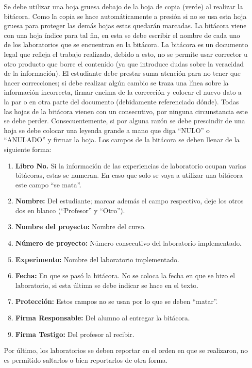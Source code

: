 \documentclass{report}
\begin{document}
Se debe utilizar una hoja gruesa debajo de la hoja de copia (verde) al realizar la
bitácora. Como la copia se hace automáticamente a presión si no se usa esta hoja gruesa para proteger las demás hojas estas quedarán marcadas. La bitácora
viene con una hoja índice para tal fin, en esta se debe escribir el nombre de cada
uno de los laboratorios que se encuentran en la bitácora.
La bitácora es un documento legal que refleja el trabajo realizado, debido a esto,
no se permite usar corrector u otro producto que borre el contenido (ya que
introduce dudas sobre la veracidad de la información). El estudiante debe prestar
suma atención para no tener que hacer correcciones; si debe realizar algún
cambio se traza una línea sobre la información incorrecta, firmar encima de la
corrección y colocar el nuevo dato a la par o en otra parte del documento
(debidamente referenciado dónde).
Todas las hojas de la bitácora vienen con un consecutivo, por ninguna
circunstancia este se debe perder. Consecuentemente, si por alguna razón se
debe prescindir de una hoja se debe colocar una leyenda grande a mano que diga
“NULO” o “ANULADO” y firmar la hoja.
Los campos de la bitácora se deben llenar de la siguiente forma:
\begin{enumerate}
\item \textbf{Libro No.} Si la información de las experiencias de laboratorio ocupan varias
bitácoras, estas se numeran. En caso que solo se vaya a utilizar una
bitácora este campo “se mata”.
\item \textbf{Nombre:} Del estudiante; marcar además el campo respectivo, deje los
otros dos en blanco (“Profesor” y “Otro”).
\item \textbf{Nombre del proyecto:} Nombre del curso.
\item \textbf{Número de proyecto:} Número consecutivo del laboratorio implementado.
\item \textbf{Experimento:} Nombre del laboratorio implementado.
\item \textbf{Fecha:} En que se pasó la bitácora. No se coloca la fecha en que se hizo el
laboratorio, si esta última se debe indicar se hace en el texto.
\item \textbf{Protección:} Estos campos no se usan por lo que se deben “matar”.
\item \textbf{Firma Responsable:} Del alumno al entregar la bitácora.
\item \textbf{Firma Testigo:} Del profesor al recibir.
\end{enumerate}
Por último, los laboratorios se deben reportar en el orden en que se realizaron, no
es permitido saltarlos o bien reportarlos de otra forma.
\end{document}

